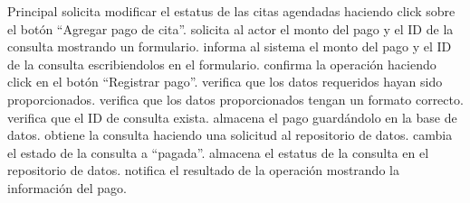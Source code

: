 \begin{UCtrayectoria}{Principal}
	\UCpaso[\UCactor] solicita modificar el estatus de las citas agendadas  haciendo click sobre el botón ``Agregar pago de cita''.
	\UCpaso solicita al actor el monto del pago y el ID de la consulta mostrando un formulario.
	\UCpaso[\UCactor] informa al sistema el monto del pago y el ID de la consulta escribiendolos en el formulario.
	\UCpaso[\UCactor] confirma la operación haciendo click en el botón ``Registrar pago''.
	\UCpaso verifica que los datos requeridos hayan sido proporcionados.
	\UCpaso verifica que los datos proporcionados tengan un formato correcto.
	\UCpaso verifica que el ID de consulta exista.
	\UCpaso almacena el pago guardándolo en la base de datos.
	\UCpaso obtiene la consulta haciendo una solicitud al repositorio de datos.
	\UCpaso cambia el estado de la consulta a “pagada”.
	\UCpaso almacena el estatus de la consulta en el repositorio de datos.
	\UCpaso notifica el resultado de la operación mostrando la información del pago.
\end{UCtrayectoria}    
